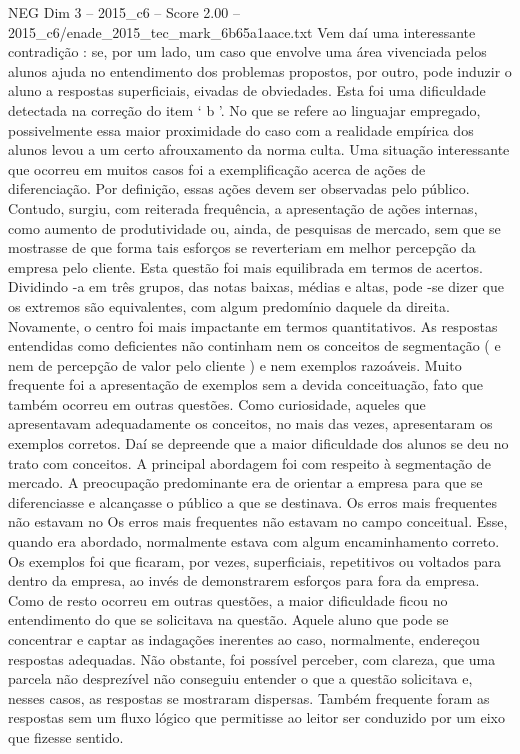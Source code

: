 \begin{textsample}{NEG Dim 3 – 2015\_c6 – Score 2.00 – 2015\_c6/enade\_2015\_tec\_mark\_6b65a1aace.txt}
Vem daí uma interessante contradição : se, por um lado, um caso que envolve uma área vivenciada pelos alunos ajuda no entendimento dos problemas propostos, por outro, pode induzir o aluno a respostas superficiais, eivadas de obviedades.
Esta foi uma dificuldade detectada na correção do item ‘ b ’.
No que se refere ao linguajar empregado, possivelmente essa maior proximidade do caso com a realidade empírica dos alunos levou a um certo afrouxamento da norma culta.
Uma situação interessante que ocorreu em muitos casos foi a exemplificação acerca de ações de diferenciação.
Por definição, essas ações devem ser observadas pelo público.
Contudo, surgiu, com reiterada frequência, a apresentação de ações internas, como aumento de produtividade ou, ainda, de pesquisas de mercado, sem que se mostrasse de que forma tais esforços se reverteriam em melhor percepção da empresa pelo cliente.
Esta questão foi mais equilibrada em termos de acertos.
Dividindo -a em três grupos, das notas baixas, médias e altas, pode -se dizer que os extremos são equivalentes, com algum predomínio daquele da direita.
Novamente, o centro foi mais impactante em termos quantitativos.
As respostas entendidas como deficientes não continham nem os conceitos de segmentação ( e nem de percepção de valor pelo cliente ) e nem exemplos razoáveis.
Muito frequente foi a apresentação de exemplos sem a devida conceituação, fato que também ocorreu em outras questões.
Como curiosidade, aqueles que apresentavam adequadamente os conceitos, no mais das vezes, apresentaram os exemplos corretos.
Daí se depreende que a maior dificuldade dos alunos se deu no trato com conceitos.
A principal abordagem foi com respeito à segmentação de mercado.
A preocupação predominante era de orientar a empresa para que se diferenciasse e alcançasse o público a que se destinava.
Os erros mais frequentes não estavam no Os erros mais frequentes não estavam no campo conceitual.
Esse, quando era abordado, normalmente estava com algum encaminhamento correto.
Os exemplos foi que ficaram, por vezes, superficiais, repetitivos ou voltados para dentro da empresa, ao invés de demonstrarem esforços para fora da empresa.
Como de resto ocorreu em outras questões, a maior dificuldade ficou no entendimento do que se solicitava na questão.
Aquele aluno que pode se concentrar e captar as indagações inerentes ao caso, normalmente, endereçou respostas adequadas.
Não obstante, foi possível perceber, com clareza, que uma parcela não desprezível não conseguiu entender o que a questão solicitava e, nesses casos, as respostas se mostraram dispersas.
Também frequente foram as respostas sem um fluxo lógico que permitisse ao leitor ser conduzido por um eixo que fizesse sentido.

\end{textsample}
